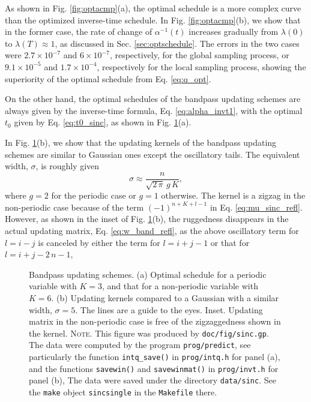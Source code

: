 \documentclass[reprint, floatfix]{revtex4-1}
\newcommand{\note}[1]{{\color{DarkGreen}\footnotesize \textsc{Note.} #1}}
\begin{document}
As shown in Fig. \ref{fig:optacmp}(a),
the optimal schedule is a more complex curve
than the optimized inverse-time schedule.
%
In Fig. \ref{fig:optacmp}(b),
we show that in the former case,
the rate of change of $\alpha^{-1}(t)$
increases gradually
from $\lambda(0)$ to $\lambda(T) \approx 1$,
as discussed in Sec. \ref{sec:optschedule}.
%
The errors in the two cases were
$2.7 \times 10^{-7}$
and
$6 \times 10^{-7}$,
respectively,
for the global sampling process,
%
or
$9.1 \times 10^{-5}$
and
$1.7 \times 10^{-4}$,
respectively
for the local sampling process,
showing the superiority of
the optimal schedule from Eq. \eqref{eq:q_opt}.



On the other hand,
the optimal schedules of the bandpass updating schemes
are always given by the inverse-time formula,
Eq. \eqref{eq:alpha_invt1},
with the optimal $t_0$
given by Eq. \eqref{eq:t0_sinc},
as shown in Fig. \ref{fig:sinc}(a).


In Fig. \ref{fig:sinc}(b),
we show that the updating kernels
of the bandpass updating schemes
are similar to Gaussian ones
except the oscillatory tails.
%
The equivalent width, $\sigma$, is roughly given
\begin{equation}
  \sigma
  \approx
  \frac
  {
    n
  }
  {
    \sqrt{ 2 \, \pi } \, g \, K
  }
  ,
\label{eq:sigma_equiv}
\end{equation}
where $g = 2$ for the periodic case
or $g = 1$ otherwise.
%
The kernel is a zigzag in the non-periodic case
because of the term $(-1)^{n+K+l-1}$
in Eq. \eqref{eq:mu_sinc_refl}.
%
However, as shown in the inset of Fig. \ref{fig:sinc}(b),
the ruggedness disappears
in the actual updating matrix, Eq. \eqref{eq:w_band_refl},
as the above oscillatory term for $l = i - j$
is canceled by either the term for $l = i + j - 1$
or that for $l = i + j - 2 \, n - 1$,


\begin{figure}[h]
\begin{center}
  \caption{
    \label{fig:sinc}
    Bandpass updating schemes.
    (a) Optimal schedule for a periodic variable
    with $K = 3$,
    and that for a non-periodic variable
    with $K = 6$.
    (b) Updating kernels
    compared to a Gaussian with a similar width,
    $\sigma = 5$.
    The lines are a guide to the eyes.
    Inset. Updating matrix in the non-periodic case
    is free of the zigzaggedness shown in the kernel.
    \note{This figure was produced by \texttt{doc/fig/sinc.gp}.
      The data were computed by the program \texttt{prog/predict},
      see particularly the function \texttt{intq\_save()}
      in \texttt{prog/intq.h} for panel (a),
      and the functions \texttt{savewin()}
      and \texttt{savewinmat()}
      in \texttt{prog/invt.h} for panel (b),
      The data were saved under the directory \texttt{data/sinc}.
      See the \texttt{make} object \texttt{sincsingle}
      in the \texttt{Makefile} there.
    }%
  }
\end{center}
\end{figure}
\end{document}
